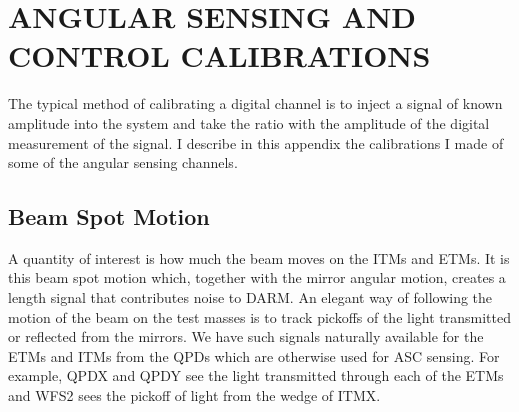 \chapter{ANGULAR SENSING AND CONTROL CALIBRATIONS}
\label{ch:ASCcal}
The typical method of calibrating a digital channel is to inject a
signal of known amplitude into the system and take the ratio with the
amplitude of the digital measurement of the signal.
I describe in this appendix the calibrations I made of some of the
angular sensing channels.



\section{Beam Spot Motion}
A quantity of interest is how much the beam moves on the ITMs and
ETMs. It is this beam spot motion which, together with the mirror
angular motion, creates a length signal that contributes noise to
DARM. An elegant way of following the motion of the beam on the test
masses is to track pickoffs of the light transmitted or reflected from
the mirrors. We have such signals naturally available for the ETMs and
ITMs from the QPDs which are otherwise used for ASC sensing. For
example, QPDX and QPDY see the light transmitted through each of the
ETMs and WFS2 sees the pickoff of light from the wedge of ITMX.


